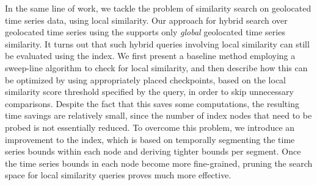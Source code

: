 
In the same line of work, we tackle the problem of similarity search on geolocated time series data, using local similarity. Our approach for hybrid search over geolocated time series using the \btsr supports only \textit{global} geolocated time series similarity. It turns out that such hybrid queries involving local similarity can still be evaluated using the \btsr index. We first present a baseline method employing a sweep-line algorithm to check for local similarity, and then describe how this can be optimized by using appropriately placed checkpoints, based on the local similarity score threshold specified by the query, in order to skip unnecessary comparisons. Despite the fact that this saves some computations, the resulting time savings are relatively small, since the number of index nodes that need to be probed is not essentially reduced. To overcome this problem, we introduce an improvement to the \btsr index, which is based on temporally segmenting the time series bounds within each node and deriving tighter bounds per segment. Once the time series bounds in each node become more fine-grained, pruning the search space for local similarity queries proves much more effective.

